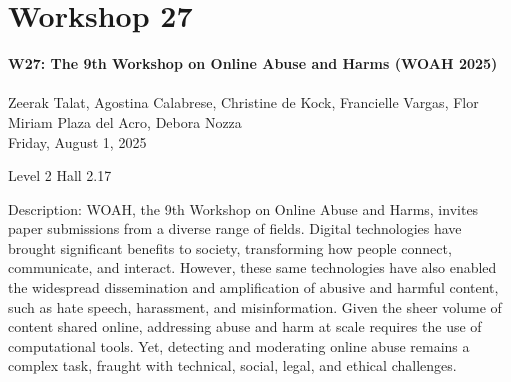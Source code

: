 \clearpage


\section[W27: The 9th Workshop on Online Abuse and Harms (WOAH 2025) ]{Workshop 27}
\label{workshop_27}

\begin{center}
    {\Large \textbf{W27: The 9th Workshop on Online Abuse and Harms (WOAH 2025) }}\\
    
\\

Zeerak Talat, Agostina Calabrese, Christine de Kock, Francielle Vargas, Flor Miriam Plaza del Acro, Debora Nozza\\

    Friday, August 1, 2025

Level 2 Hall 2.17

\end{center}

Description: WOAH, the 9th Workshop on Online Abuse and Harms, invites paper submissions from a diverse range of fields. Digital technologies have brought significant benefits to society, transforming how people connect, communicate, and interact. However, these same technologies have also enabled the widespread dissemination and amplification of abusive and harmful content, such as hate speech, harassment, and misinformation. Given the sheer volume of content shared online, addressing abuse and harm at scale requires the use of computational tools. Yet, detecting and moderating online abuse remains a complex task, fraught with technical, social, legal, and ethical challenges. 

